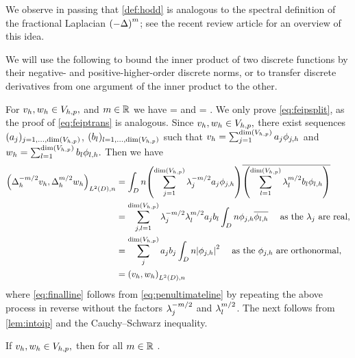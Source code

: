We observe in passing that \cref{def:hodd} is analogous to the spectral definition of the fractional Laplacian $\mleft(-\Delta\mright)^m$; see the recent review article \cite[Section 2.5.1]{LiPaGuSoGlZhMaCaMeAiKa:18} for an overview of this idea.
\ere

We will use the following  to bound the inner product of two discrete functions by their negative- and positive-higher-order discrete norms, or to transfer discrete derivatives from one argument of the inner product to the other.

\label{lem:intoip}
For $v_{h}, w_{h} \in V_{h,p},$ and $m \in \mathbb R$ we have
\beq\label{eq:feipsplit}
\IPLtDn{\vh}{\wh} = \IPLtDn{\Deltahmmt \vh}{\Deltahmt \wh} 
\eeq
and
\beq\label{eq:feiptrans}
 = \IPLtDn{\Deltahmt \vh}{\Deltahmt \vh}.
\eeq
\ele
{}
We only prove \cref{eq:feipsplit}, as the proof of \cref{eq:feiptrans} is analogous. Since $v_{h},w_{h} \in V_{h,p},$ there exist sequences $(\aj)_{j =1,\ldots,\dimVhp}$, $(\bsl)_{l =1,\ldots,\dimVhp}$ such that $\vh = \sum_{j=1}^{\dimVhp} \aj\phijh$ and $\wh = \sum_{l=1}^{\dimVhp} \bsl \philh.$ Then we have
\begin{align}
\IPLtDn{\Deltahmmt \vh}{\Deltahmt \wh} &= \int_D n\mleft(\sum_{j=1}^{\dimVhp}\lambdaj^{-m/2} \aj\phijh\mright)\overline{\mleft(\sum_{l=1}^{\dimVhp} \lambdal^{m/2}\bsl \philh\mright)}\nonumber\\
&= \sum_{j,l=1}^{\dimVhp} \lambdaj^{-m/2} \lambdal^{m/2} \aj \bsl \int_D n \phijh \philhbar\quad \text{ as the } \lambdaj \text{ are real,}\nonumber\\
& =\sum_{j}^{\dimVhp} \aj \bsj \int_D n\abs{\phijh}^2\quad \text{ as the } \phijh \text{ are orthonormal,}\label{eq:penultimateline}\\
&= \IPLtDn{\vh}{\wh}\label{eq:finalline}
\end{align}
where \cref{eq:finalline} follows from \cref{eq:penultimateline} by repeating the above process in reverse without the factors $\lambda_{j}^{-m/2}$ and $\lambda_{l}^{m/2}$.
\epf
The next  follows from \cref{lem:intoip} and the Cauchy--Schwarz inequality.

\label{cor:ipdiscbound}
If $v_{h}, w_{h} \in V_{h,p},$ then for all $m \in \mathbb R$
\beqs
\IPLtDn{\vh}{\wh} \leq \Nmmhn{\vh}\Nmhn{\wh}.
\eeqs
\eco

